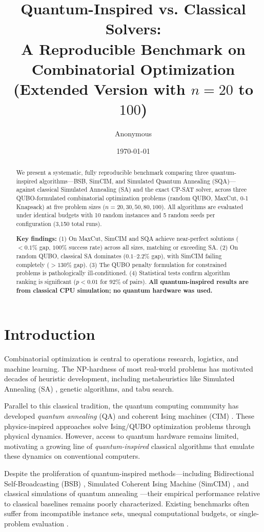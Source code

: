 \documentclass[10pt,twocolumn]{article}
\title{Quantum-Inspired vs. Classical Solvers:\\A Reproducible Benchmark on Combinatorial Optimization\\(Extended Version with $n=20$ to $100$)}
\author{Anonymous}
\date{\today}
\begin{document}
\maketitle

\begin{abstract}
We present a systematic, fully reproducible benchmark comparing three quantum-inspired algorithms---BSB, SimCIM, and Simulated Quantum Annealing (SQA)---against classical Simulated Annealing (SA) and the exact CP-SAT solver, across three QUBO-formulated combinatorial optimization problems (random QUBO, MaxCut, 0-1 Knapsack) at five problem sizes ($n=20,30,50,80,100$). All algorithms are evaluated under identical budgets with 10 random instances and 5 random seeds per configuration (3,150 total runs). 

\noindent\textbf{Key findings:} (1) On MaxCut, SimCIM and SQA achieve near-perfect solutions ($<0.1\%$ gap, $100\%$ success rate) across all sizes, matching or exceeding SA. (2) On random QUBO, classical SA dominates ($0.1$--$2.2\%$ gap), with SimCIM failing completely ($>130\%$ gap). (3) The QUBO penalty formulation for constrained problems is pathologically ill-conditioned. (4) Statistical tests confirm algorithm ranking is significant ($p<0.01$ for $92\%$ of pairs). 
\noindent\textbf{All quantum-inspired results are from classical CPU simulation; no quantum hardware was used.}
\end{abstract}

\section{Introduction}
\label{sec:intro}

Combinatorial optimization is central to operations research, logistics, and machine learning. The NP-hardness of most real-world problems has motivated decades of heuristic development, including metaheuristics like Simulated Annealing (SA) \cite{kirkpatrick1983}, genetic algorithms, and tabu search.

Parallel to this classical tradition, the quantum computing community has developed \emph{quantum annealing} (QA) \cite{kadowaki1998} and coherent Ising machines (CIM) \cite{yamamoto2022}. These physics-inspired approaches solve Ising/QUBO optimization problems through physical dynamics. However, access to quantum hardware remains limited, motivating a growing line of \emph{quantum-inspired} classical algorithms that emulate these dynamics on conventional computers.

Despite the proliferation of quantum-inspired methods---including Bidirectional Self-Broadcasting (BSB) \cite{peterson1991}, Simulated Coherent Ising Machine (SimCIM) \cite{leleu2021}, and classical simulations of quantum annealing \cite{openjij}---their empirical performance relative to classical baselines remains poorly characterized. Existing benchmarks often suffer from incompatible instance sets, unequal computational budgets, or single-problem evaluation \cite{venturelli2023}.
\end{document}
